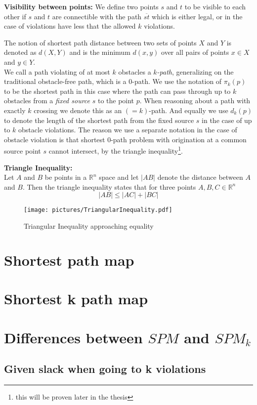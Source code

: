 \begin{mydef}
	\textbf{Visibility between points:}
    We define two points $s$ and $t$ to be visible to each other if $s$ and $t$ are 
    connectible with the path $\overline{st}$ which is either legal, or in the case 
    of violations have less that the allowed $k$ violations.
\end{mydef}

The notion of shortest path distance between two sets of points $X$ and $Y$ is 
denoted as $d(X,Y)$ and is the minimum $d(x,y)$ over all pairs of points $x\in X$ 
and $y \in Y$. \cite{HershbergerS99} \\

We call a path violating of at most $k$ obstacles a \textit{$k$-path}, generalizing 
on the traditional obstacle-free path, which is a 0-path. We use the notation of 
$\pi_k(p)$ to be the shortest path in this case where the path can pass through up 
to $k$ obstacles from a \textit{fixed source} $s$ to the point $p$. When reasoning 
about a path with exactly $k$ crossing we denote this as an $(=k)$-path. And 
equally we use $d_k(p)$ to denote the length of the shortest path from the fixed 
source $s$ in the case of up to $k$ obstacle violations. The reason we use a 
separate notation in the case of obstacle violation is that shortest 0-path 
problem with origination at a common source point $s$ cannot intersect, by the 
triangle inequality\cite{HershbergerKS17}\footnote{this will be proven later in 
the thesis}.

\begin{mydef}
	\textbf{Triangle Inequality:} \\ 
	Let $A$ and $B$ be points in a $\mathbb{R}^n$ space and let $|AB|$ denote
	the distance between $A$ and $B$.  Then the triangle inequality states that
	for three points $A,B,C\in\mathbb{R}^n$ \cite{metricspaceandpoints}
	$$|AB|\leq|AC|+|BC|$$
\end{mydef} 
\begin{figure}[H] 
	\centering
	\texttt{[image: pictures/TriangularInequality.pdf]}
	\caption{Triangular Inequality approaching equality}
	\label{fig:TriangularInequality} 
\end{figure}


\section{Shortest path map}

\section{Shortest k path map}

\section{Differences between $SPM$ and $SPM_k$}

\subsection{Given slack when going to k violations}